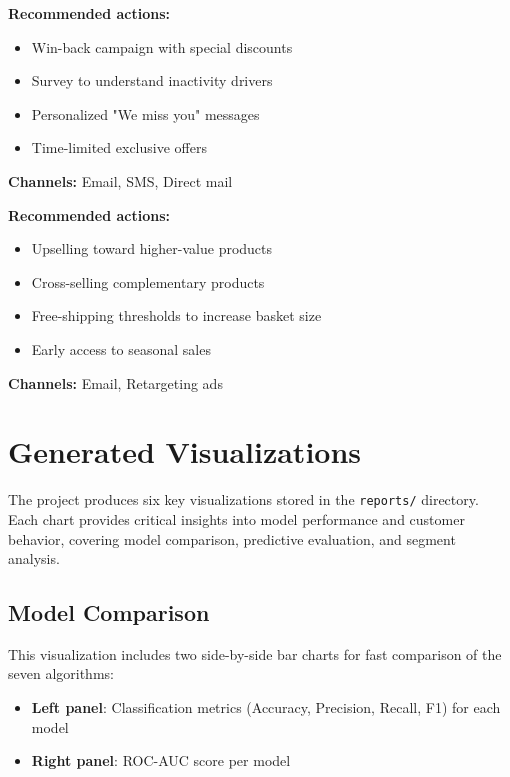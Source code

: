 \documentclass[12pt,a4paper]{article}
\begin{document}
\begin{tcolorbox}[title=At-Risk Segment (Priority: URGENT), colback=white, colframe=black]
\textbf{Recommended actions:}
\begin{itemize}
    \item Win-back campaign with special discounts
    \item Survey to understand inactivity drivers
    \item Personalized "We miss you" messages
    \item Time-limited exclusive offers
\end{itemize}
\textbf{Channels:} Email, SMS, Direct mail
\end{tcolorbox}

\begin{tcolorbox}[title=Active Customers Segment (Priority: MEDIUM), colback=white, colframe=black]
\textbf{Recommended actions:}
\begin{itemize}
    \item Upselling toward higher-value products
    \item Cross-selling complementary products
    \item Free-shipping thresholds to increase basket size
    \item Early access to seasonal sales
\end{itemize}
\textbf{Channels:} Email, Retargeting ads
\end{tcolorbox}

\section{Generated Visualizations}

The project produces six key visualizations stored in the \texttt{reports/} directory. Each chart provides critical insights into model performance and customer behavior, covering model comparison, predictive evaluation, and segment analysis.

\subsection{Model Comparison}

This visualization includes two side-by-side bar charts for fast comparison of the seven algorithms:
\begin{itemize}
    \item \textbf{Left panel}: Classification metrics (Accuracy, Precision, Recall, F1) for each model
    \item \textbf{Right panel}: ROC-AUC score per model
\end{itemize}
\end{document}
